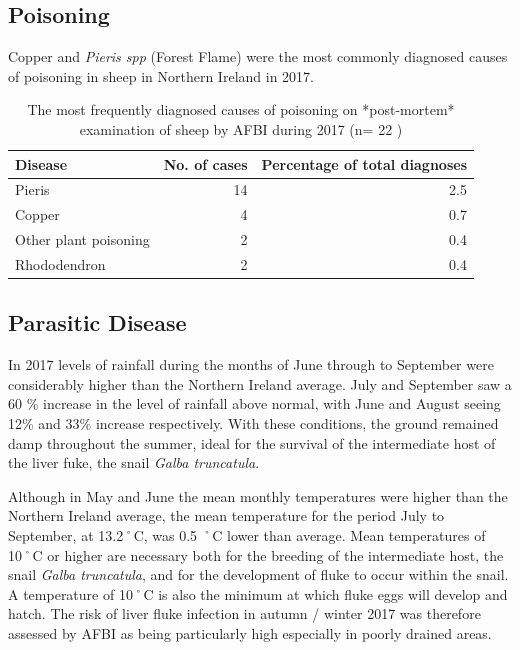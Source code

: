 \documentclass[]{book}
\begin{document}
\subsection{Poisoning}\label{poisoning}

Copper and \emph{Pieris spp} (Forest Flame) were the most commonly
diagnosed causes of poisoning in sheep in Northern Ireland in 2017.

\begin{table}

\caption{\label{tab:unnamed-chunk-89}The  most frequently diagnosed causes of poisoning on *post-mortem* examination of sheep by AFBI during 2017 (n= 22 )}
\centering
\begin{tabular}[t]{l|r|r}
\hline
Disease & No. of cases & Percentage of total diagnoses\\
\hline
Pieris & 14 & 2.5\\
\hline
Copper & 4 & 0.7\\
\hline
Other plant poisoning & 2 & 0.4\\
\hline
Rhododendron & 2 & 0.4\\
\hline
\end{tabular}
\end{table}

\subsection{Parasitic Disease}\label{parasitic-disease}

In 2017 levels of rainfall during the months of June through to
September were considerably higher than the Northern Ireland average.
July and September saw a 60 \% increase in the level of rainfall above
normal, with June and August seeing 12\% and 33\% increase respectively.
With these conditions, the ground remained damp throughout the summer,
ideal for the survival of the intermediate host of the liver fuke, the
snail \emph{Galba truncatula}.

Although in May and June the mean monthly temperatures were higher than
the Northern Ireland average, the mean temperature for the period July
to September, at 13.2˚C, was 0.5 ˚C lower than average. Mean
temperatures of 10˚C or higher are necessary both for the breeding of
the intermediate host, the snail \emph{Galba truncatula}, and for the
development of fluke to occur within the snail. A temperature of 10˚C is
also the minimum at which fluke eggs will develop and hatch. The risk of
liver fluke infection in autumn / winter 2017 was therefore assessed by
AFBI as being particularly high especially in poorly drained areas.
\end{document}
